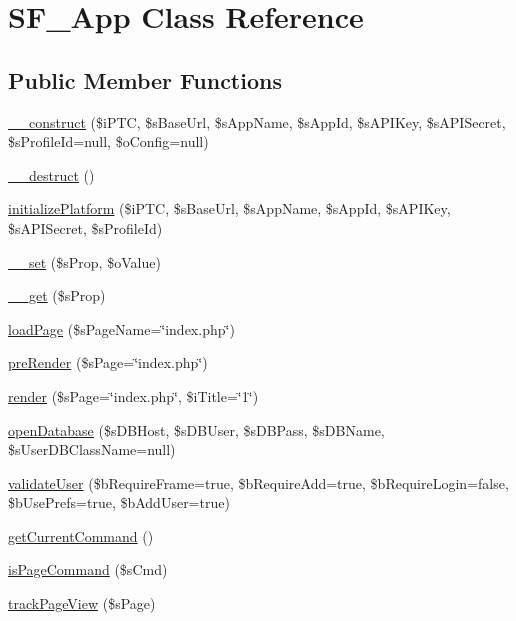 \hypertarget{classSF__App}{
\section{SF\_\-App Class Reference}
\label{classSF__App}
}
\subsection*{Public Member Functions}
\begin{DoxyCompactItemize}
\item 
\hyperlink{classSF__App_a00d6c37e1b068b8a5987da26d04b6059}{\_\-\_\-construct} (\$iPTC, \$sBaseUrl, \$sAppName, \$sAppId, \$sAPIKey, \$sAPISecret, \$sProfileId=null, \$oConfig=null)
\item 
\hyperlink{classSF__App_a421831a265621325e1fdd19aace0c758}{\_\-\_\-destruct} ()
\item 
\hyperlink{classSF__App_a87941bc6e0f9b9f2d7f1d77f9906eb08}{initializePlatform} (\$iPTC, \$sBaseUrl, \$sAppName, \$sAppId, \$sAPIKey, \$sAPISecret, \$sProfileId)
\item 
\hyperlink{classSF__App_a9ad3d2905b2a50dfbee6d5f473e758a9}{\_\-\_\-set} (\$sProp, \$oValue)
\item 
\hyperlink{classSF__App_a9519b5bba407a1a89f324fcc7f26c0e2}{\_\-\_\-get} (\$sProp)
\item 
\hyperlink{classSF__App_ae1ecd9ab5b45268eb8405fcd83011fb0}{loadPage} (\$sPageName=\char`\"{}index.php\char`\"{})
\item 
\hyperlink{classSF__App_a1404a2a435e6df83c906a296e1c5461b}{preRender} (\$sPage=\char`\"{}index.php\char`\"{})
\item 
\hyperlink{classSF__App_a79f6c757cc35a847495f9254503dfa8f}{render} (\$sPage=\char`\"{}index.php\char`\"{}, \$iTitle=\char`\"{}1\char`\"{})
\item 
\hyperlink{classSF__App_a1a2c07721f5c3d4bcc78eb557e2dfd21}{openDatabase} (\$sDBHost, \$sDBUser, \$sDBPass, \$sDBName, \$sUserDBClassName=null)
\item 
\hyperlink{classSF__App_a18a992b92ee5ff3ad60ec30d8e0cba60}{validateUser} (\$bRequireFrame=true, \$bRequireAdd=true, \$bRequireLogin=false, \$bUsePrefs=true, \$bAddUser=true)
\item 
\hyperlink{classSF__App_a245ca49c58ae5e1c2efcdea0369d5b22}{getCurrentCommand} ()
\item 
\hyperlink{classSF__App_aac5925714018c3a661eba69a737d6597}{isPageCommand} (\$sCmd)
\item 
\hyperlink{classSF__App_a06cc1f1b035e423dce27f7db925a17c0}{trackPageView} (\$sPage)

\end{DoxyCompactItemize}
